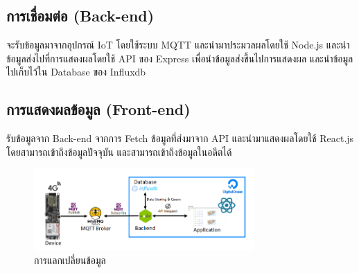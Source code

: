 \subsection{การเชื่อมต่อ (Back-end)}
จะรับข้อมูลมาจากอุปกรณ์ IoT โดยใช้ระบบ MQTT และนำมาประมวลผลโดยใช้ Node.js และนำข้อมูลส่งไปที่การแสดงผลโดยใช้ API ของ Express เพื่อนำข้อมูลส่งขึ้นไปการแสดงผล และนำข้อมูลไปเก็บไว้ใน Database ของ Influxdb

\subsection{การแสดงผลข้อมูล (Front-end)}
รับข้อมูลจาก Back-end จากการ Fetch ข้อมูลที่ส่งมาจาก API และนำมาแสดงผลโดยใช้ React.js โดยสามารถเข้าถึงข้อมูลปัจจุบัน และสามารถเข้าถึงข้อมูลในอดีตได้

\begin{figure}[h!]
    \begin{center}
      \includegraphics[width=0.75\textwidth]{exchange-data.png}
    \end{center}
    \caption{การแลกเปลี่ยนข้อมูล}
    \label{fig:exchangedata}
  \end{figure}